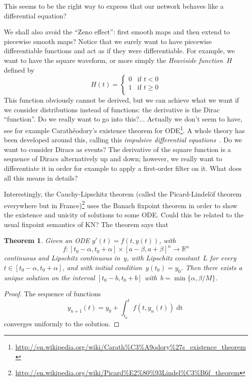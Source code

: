\documentclass{article}
\newtheorem{theorem}{Theorem}
\newcommand{\dd}[1]{\mathop{\mathrm{d}#1}}
\newcommand{\R}{\mathbb{R}}
\begin{document}
\noindent This seems to be the right way to express that our network behaves
like a differential equation?

We shall also avoid the ``Zeno effect'': first smooth maps and then extend to
piecewise smooth maps? Notice that we surely want to have piecewise
differentiable functions and act as if they were differentiable. For example, we
want to have the square waveform, or more simply the \emph{Heaviside
  function}~$H$ defined by
\[
H(t)=
\begin{cases}
  0&\text{if $t<0$}\\
  1&\text{if $t\geq 0$}\\
\end{cases}
\]
This function obviously cannot be derived, but we can achieve what we want if we
consider distributions instead of functions: the derivative is the Dirac
``function''. Do we really want to go into this?... Actually we don't seem to
have, see for example Carathéodory's existence theorem for
ODE\footnote{\url{http://en.wikipedia.org/wiki/Carath\%C3\%A9odory\%27s_existence_theorem}}. A
whole theory has been developed around this, calling this \emph{impulsive
  differential equations}~\cite{lakshmikantham1989theory}. Do we want to
consider Diracs as events? The derivative of the square function is a sequence
of Diracs alternatively up and down; however, we really want to differentiate it
in order for example to apply a first-order filter on it. What does all this
means in details?

Interestingly, the Cauchy-Lipschitz theorem (called the Picard-Lindelöf theorem
everywhere but in
France)\footnote{\url{http://en.wikipedia.org/wiki/Picard\%E2\%80\%93Lindel\%C3\%B6f_theorem}}
uses the Banach fixpoint theorem in order to show the existence and unicity of
solutions to some ODE. Could this be related to the usual fixpoint semantics
of KN? The theorem says that

\begin{theorem}
  Given an ODE $y'(t)=f(t,y(t))$, with
  \[
  f:[t_0-\alpha,t_0+\alpha]\times[a-\beta,a+\beta]^n\to\R^n
  \]
  continuous and Lipschitz continuous in~$y$, with Lipschitz constant~$L$ for
  every \hbox{$t\in[t_0-\alpha,t_0+\alpha]$}, and with initial
  condition~$y(t_0)=y_0$.  Then there exists a unique solution on the interval
  $[t_0-b,t_0+b]$ with~$b=\min\{\alpha,\beta/M\}$.
\end{theorem}
\begin{proof}
  The sequence of functions
  \[
  y_{n+1}(t)=y_0+\int_{t_0}^tf(t,y_n(t))\dd t
  \]
  converges uniformly to the solution.
\end{proof}
\end{document}
